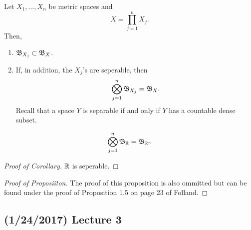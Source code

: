 \documentclass[11pt,leqno,oneside]{amsbook}
\numberwithin{thm}{section}
\begin{document}
\begin{prop}
  Let $X_1, \ldots, X_n$ be metric spaces and \[
    X = \prod_{j=1}^n X_j.
  \]
  Then,
  \begin{enumerate}
  \item $\mathfrak{B}_{X_j} \subset \mathfrak{B}_X$.
  \item If, in addition, the $X_j$'s are seperable, then \[
      \bigotimes_{j=1}^n \mathfrak{B}_{X_j} = \mathfrak{B}_X.
    \]
    Recall that a space $Y$ is separable if and only if $Y$ has a
    countable dense subset.
  \end{enumerate}
\end{prop}
\begin{cor}
  \[
    \bigotimes_{j=1}^n \mathfrak{B}_{\mathbb R} = \mathfrak{B}_{{\mathbb R}^n}
  \]
\end{cor}
\begin{proof}[Proof of Corollary]
  ${\mathbb R}$ is seperable.
\end{proof}
\begin{proof}[Proof of Proposiiton]
  The proof of this proposition is also ommitted but can be found
  under the proof of Proposition 1.5 on page 23 of Folland.
\end{proof}
\subsection*{(1/24/2017) Lecture 3}
\end{document}
